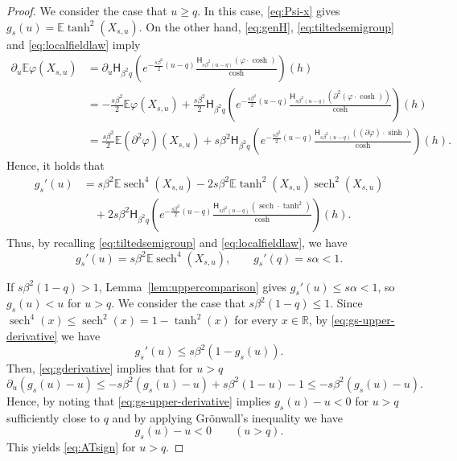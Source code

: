 \documentclass[11pt]{article}
\numberwithin{equation}{section}
\newcommand{\E}{\mathbb{E}}
\newcommand{\1}{\mathbf 1}
\newcommand{\sech}{\operatorname{sech}}
\begin{document}
\begin{proof}
We consider the case that $u\ge q$.
In this case, \eqref{eq:Psi-x} gives $g_s(u)=\E\tanh^2(X_{s,u})$.
On the other hand, \eqref{eq:genH}, \eqref{eq:tiltedsemigroup} and \eqref{eq:localfieldlaw} imply
\begin{align*}
\partial _u \E\varphi(X_{s,u}) &= \partial _u \mathsf H_{\beta ^2 q} \left( e^{-\frac{s\beta ^2}{2}(u-q)} \frac{\mathsf H_{s\beta ^2 (u-q)}(\varphi \cdot \cosh )}{\cosh} \right) (h) \\
%
&= -\frac{s\beta ^2}{2}\E\varphi(X_{s,u}) + \frac{s\beta ^2}{2} \mathsf H_{\beta ^2 q} \left( e^{-\frac{s\beta ^2}{2}(u-q)} \frac{\mathsf H_{s\beta ^2 (u-q)}( \partial ^2 (\varphi \cdot \cosh) )}{\cosh} \right) (h) \\
%
&= \frac{s\beta ^2}{2} \E (\partial ^2 \varphi )(X_{s,u}) + s\beta ^2 \mathsf H_{\beta ^2 q} \left( e^{-\frac{s\beta ^2}{2}(u-q)} \frac{\mathsf H_{s\beta ^2 (u-q)}( ( \partial \varphi ) \cdot \sinh )}{\cosh} \right) (h).
\end{align*}
Hence, it holds that
\begin{align*}
g_s'(u) &= s\beta ^2 \E \sech ^4 (X_{s,u}) -2 s\beta ^2 \E \tanh ^2(X_{s,u}) \sech ^2 (X_{s,u})\\
&\quad + 2 s\beta ^2 \mathsf H_{\beta ^2 q} \left( e^{-\frac{s\beta ^2}{2}(u-q)} \frac{\mathsf H_{s\beta ^2 (u-q)}( \sech \cdot \tanh ^2 )}{\cosh} \right) (h).
\end{align*}
Thus, by recalling \eqref{eq:tiltedsemigroup} and \eqref{eq:localfieldlaw}, we have
\begin{equation}
 g_s'(u)=s\beta^2\E\sech^4(X_{s,u}),
 \qquad g_s'(q)=s\alpha<1.
 \label{eq:gs-upper-derivative}
\end{equation}

If $s\beta^2(1-q)>1$, Lemma~\ref{lem:uppercomparison} gives
$g_s'(u)\le s\alpha <1$, so $g_s(u)<u$ for $u>q$.
We consider the case that $s\beta^2(1-q)\le1$.
Since
$\sech^4(x)\le\sech^2(x)=1-\tanh^2(x)$ for every $x\in\mathbb R$,
by \eqref{eq:gs-upper-derivative} we have
\begin{equation}\label{eq:gderivative}
 g_s'(u)\le s\beta^2(1-g_s(u)).
\end{equation}
Then, \eqref{eq:gderivative} implies that for $u>q$
\[
\partial _u (g_s(u) -u) \leq -s\beta ^2 (g_s(u)-u) + s\beta ^2 (1-u) -1 \leq -s\beta ^2 (g_s(u)-u) .
\]
Hence, by noting that \eqref{eq:gs-upper-derivative} implies $g_s(u)-u <0$ for $u>q$ sufficiently close to $q$ and by applying Gr\"onwall's inequality we have
\[
g_s(u) - u < 0 \qquad (u>q) .
\]
This yields \eqref{eq:ATsign} for $u>q$.


\end{proof}
\end{document}
